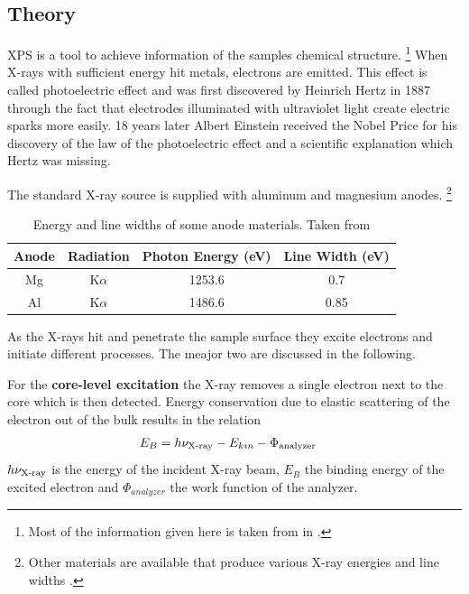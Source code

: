 \subsection{Theory}
\label{section:XPS} XPS is a tool to achieve information of the samples chemical structure.
\footnote{Most of the information given here is taken from \cite{Riviere_90} in \cite{briggs_auger_1990}.}
When X-rays with sufficient energy hit metals, electrons are emitted. This effect is called photoelectric effect and was first discovered by Heinrich Hertz in 1887 through the fact that electrodes illuminated with ultraviolet light create electric sparks more easily\cite{hertz_ueber_1887}. 18 years later Albert Einstein received the Nobel Price for his discovery of the law of the photoelectric effect\cite{_nobel_2015} and a scientific explanation which Hertz was missing.

The standard X-ray source is supplied with aluminum and magnesium anodes. \footnote{Other materials are available that produce various X-ray energies and line widths  \cite{_x-ray_2015}.}
\begin{table}\caption{Energy and line widths of some anode materials. Taken from \cite{_x-ray_2015}}
	\centering
	\begin{tabular}{cccc}
		Anode 	& 	Radiation 	& Photon Energy (eV) 	& Line Width (eV) \\ \hline
		Mg	&	K$\alpha$ 	&	1253.6	&	0.7\\
		Al	&	K$\alpha$ 	&	1486.6 	&	0.85\\
	\end{tabular}
\end{table}

As the X-rays hit and penetrate the sample surface they excite electrons and initiate different processes. The meajor two are discussed in the following.

For the \textbf{core-level excitation} the X-ray removes a single electron next to the core which is then detected. Energy conservation due to elastic scattering of the electron out of the bulk results in the relation 
\begin{align}
E_B 	&=h\nu_{\textnormal{X-ray}}-E_{kin}-\Phi_{\textnormal{analyzer}}
\end{align}
 $h\nu_{\textnormal{X-ray}}$ is the energy of the incident X-ray beam, $E_B$ the binding energy of the excited electron and $\Phi_{analyzer}$ the work function of the analyzer. 
 
